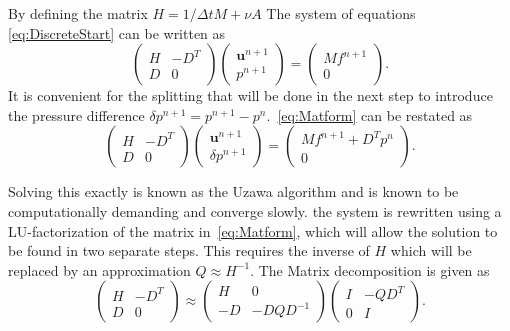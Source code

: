 By defining the matrix $H = 1/\Delta t M + \nu A$ The system of equations \ref{eq:DiscreteStart} 
can be written as 
\begin{equation}
\begin{pmatrix}
    H & -D^T \\ 
    D & 0
\end{pmatrix}
\begin{pmatrix}
    \mathbf{u}^{n+1}  \\ 
    p^{n+1} 
\end{pmatrix}
=
\begin{pmatrix}
    Mf^{n+1}  \\ 
    0 
    \end{pmatrix}.
    \label{eq:Matform}
\end{equation}
It is convenient for the splitting that will be done in the next step to introduce the 
pressure difference $\delta p^{n+1} = p^{n+1}-p^n$.~\ref{eq:Matform} can be restated as 
\begin{equation}
\begin{pmatrix}
    H & -D^T \\ 
    D & 0
\end{pmatrix}
\begin{pmatrix}
    \mathbf{u}^{n+1}  \\ 
    \delta p^{n+1} 
\end{pmatrix}
=
\begin{pmatrix}
    Mf^{n+1} +D^Tp^n  \\ 
    0 
    \end{pmatrix}.
    \label{eq:Matform}
\end{equation}

Solving this exactly is known as the Uzawa algorithm and is known to be 
computationally demanding and converge slowly. 
the system is rewritten using a LU-factorization of the matrix in~\ref{eq:Matform}, 
which will allow the solution to be found in two separate steps. This 
requires the inverse of $H$ which will be replaced by an approximation $Q\approx H^{-1}$.
The Matrix decomposition is given as
%
\begin{equation}
\begin{pmatrix}
    H & -D^T \\ 
    D & 0
\end{pmatrix}
\approx
\begin{pmatrix}
    H & 0 \\ 
    -D & -DQD^{-1}
\end{pmatrix}
\begin{pmatrix}
    I & -QD^T \\ 
    0 & I
\end{pmatrix}.
    \label{eq:LUfactorization}
\end{equation}
%

